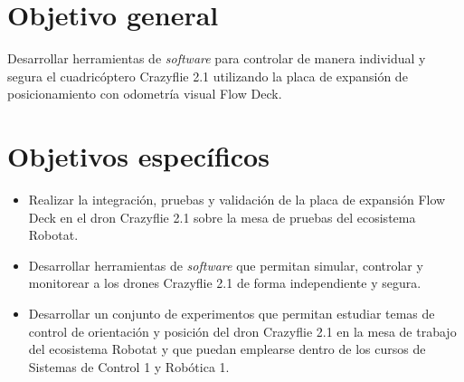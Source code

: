 \section{Objetivo general}
Desarrollar herramientas de \textit{software} para controlar de manera individual y segura el cuadricóptero Crazyflie 2.1 utilizando la placa de expansión de posicionamiento con odometría visual Flow Deck.

\section{Objetivos específicos}
\begin{itemize}
	\item Realizar la integración, pruebas y validación de la placa de expansión Flow Deck en el dron Crazyflie 2.1 sobre la mesa de pruebas del ecosistema Robotat.  
	\item Desarrollar herramientas de \textit{software} que permitan simular, controlar y monitorear a los drones Crazyflie 2.1 de forma independiente y segura.
	\item Desarrollar un conjunto de experimentos que permitan estudiar temas de control de orientación y posición del dron Crazyflie 2.1 en la mesa de trabajo del ecosistema Robotat y que puedan emplearse dentro de los cursos de Sistemas de Control 1 y Robótica 1. 
\end{itemize}

